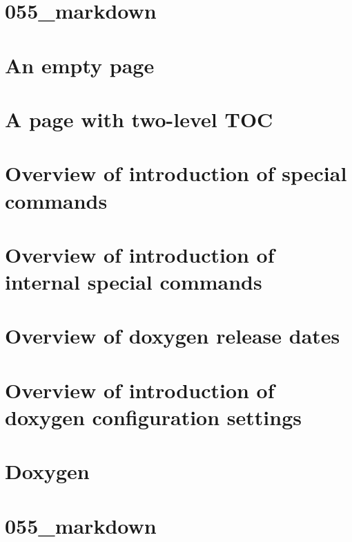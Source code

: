 \documentclass[twoside]{book}
\newcommand{\+}{\discretionary{\mbox{\scriptsize$\hookleftarrow$}}{}{}}
\begin{document}
\chapter{055\+\_\+markdown}
\label{md_doxygen_build_doxygen_testing_055_markdown}

\chapter{An empty page}
\label{empty}

\chapter{A page with two-\/level TOC}
\label{levels}

\chapter{Overview of introduction of special commands}
\label{md_doxygen_doc_internal_commands_history}

\chapter{Overview of introduction of internal special commands}
\label{md_doxygen_doc_internal_commands_internal}

\chapter{Overview of doxygen release dates}
\label{md_doxygen_doc_internal_releases}

\chapter{Overview of introduction of doxygen configuration settings}
\label{md_doxygen_doc_internal_tags_history}

\chapter{Doxygen}
\label{md_doxygen__r_e_a_d_m_e}

\chapter{055\+\_\+markdown}
\label{md_doxygen_testing_055_markdown}

\end{document}
